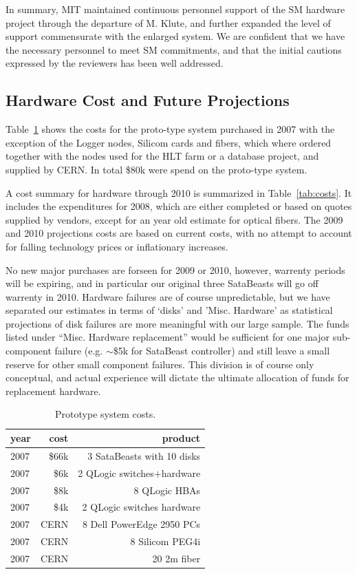 In summary, MIT maintained continuous personnel support of the SM hardware project 
through the departure of M. Klute, and further expanded the level of support
commensurate with the enlarged system.
We are confident that we have the necessary personnel to meet SM commitments,
and that the initial cautions expressed by the reviewers 
has been well addressed.


\subsection{Hardware Cost and Future Projections}
Table~\ref{tab:proto} shows the costs for the proto-type system purchased in 2007 
with the exception of the Logger nodes, Silicom cards and fibers, 
which where ordered together with the nodes used for the HLT farm or a database project,
and supplied by CERN. 
In total \$80k were spend on the proto-type system. 

A cost summary for hardware through 2010 is summarized in  Table~\ref{tab:costs}.
It includes the expenditures for 2008, which are either completed
or based on quotes supplied by vendors, except for an year old estimate 
for optical fibers.
The 2009 and 2010 projections costs are based on current costs,
with no attempt to account for falling technology prices or inflationary increases.

No new major purchases are forseen for 2009 or 2010, 
however, warrenty periods will be expiring, and in particular our original
three SataBeasts will go off warrenty in 2010.
Hardware failures are of course unpredictable, but we have separated
our estimates in terms of `disks' and 'Misc. Hardware' as  statistical
projections of disk failures are more meaningful with our large sample.
The funds listed under ``Misc. Hardware replacement'' would be sufficient
for one major sub-component failure (e.g. $\sim$\$5k for SataBeast controller) and
still leave a small reserve for other small component failures.
This division is of course only conceptual, and
actual experience will dictate the ultimate allocation of funds for replacement 
hardware.

\begin{table}[!ht]
\begin{center}
\begin{tabular}{l|r|r}
year & cost    & product \\\hline\hline
2007 & \$66k   & 3 SataBeasts with 10 disks  \\\hline
2007 & \$6k    & 2 QLogic switches$+$hardware  \\\hline
2007 & \$8k    & 8 QLogic HBAs \\\hline
2007 & \$4k    & 2 QLogic switches hardware \\\hline
2007 & CERN    & 8 Dell PowerEdge 2950 PCs\\\hline
2007 & CERN    & 8 Silicom PEG4i \\\hline
2007 & CERN    & 20 2m fiber \\\hline\hline
\end{tabular}
\caption{Prototype system costs.}
\label{tab:proto}
\end{center}
\end{table}

